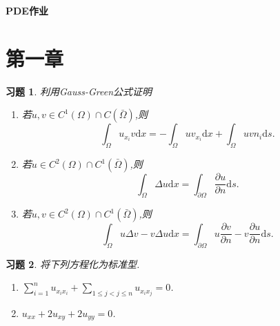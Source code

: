 \documentclass[a4paper,oneside,12pt]{ctexart}
\theoremstyle{plain}
\newtheorem{exercise}{习题}[section]
\theoremstyle{nonumberplain}
\theoremstyle{nonumberplain}
\newcommand{\dif}{\mathrm{d}}
\newcommand{\ptl}{\partial}
\begin{document}
    \begin{center}
        \LARGE\bfseries
        PDE作业
    \end{center}

    \section{第一章}
    
    \begin{exercise}\label{ex:1.1}
        利用Gauss-Green公式证明
        \begin{enumerate}
            \item 若$u,v\in C^1(\Omega)\cap C(\bar{\Omega})$,则\begin{equation*}
                \int_\Omega u_{x_i}v\dif x=-\int_\Omega uv_{x_i}\dif x+\int_\Omega uvn_i\dif s.
            \end{equation*}
            \item 若$u\in C^2(\Omega)\cap C^1(\bar{\Omega})$,则\begin{equation*}
                \int_\Omega \Delta u\dif x=\int_{\ptl\Omega}\frac{\ptl u}{\ptl n}\dif s.
            \end{equation*}
            \item 若$u,v\in C^2(\Omega)\cap C^1(\bar{\Omega})$,则\begin{equation*}
                \int_\Omega u\Delta v-v\Delta u\dif x=\int_{\ptl \Omega}u\frac{\ptl v}{\ptl n}-v\frac{\ptl u}{\ptl n}\dif s.
            \end{equation*}
        \end{enumerate}
    \end{exercise}

    \begin{exercise}
        \label{ex:1.2}
        将下列方程化为标准型.
        \begin{enumerate}
            \item $\sum_{i=1}^nu_{x_ix_i}+\sum_{1\leqslant j<j\leqslant n}u_{x_ix_j}=0$.
            \item $u_{xx}+2u_{xy}+2u_{yy}=0$.
        \end{enumerate}
    \end{exercise}
\end{document}
